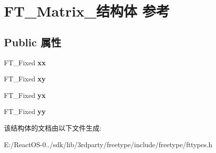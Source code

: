\hypertarget{struct_f_t___matrix__}{}\section{F\+T\+\_\+\+Matrix\+\_\+结构体 参考}
\label{struct_f_t___matrix__}
\subsection*{Public 属性}
\begin{DoxyCompactItemize}
\item 
\mbox{\label{struct_f_t___matrix___a27d51c2958634abe7bf377610e095f74}} 
F\+T\+\_\+\+Fixed {\bfseries xx}
\item 
\mbox{\label{struct_f_t___matrix___a7e9f439d37c00ba1a11919bcaa8937a2}} 
F\+T\+\_\+\+Fixed {\bfseries xy}
\item 
\mbox{\label{struct_f_t___matrix___a55792583a843a1611b43c40534a02a17}} 
F\+T\+\_\+\+Fixed {\bfseries yx}
\item 
\mbox{\label{struct_f_t___matrix___a689a6fd20a88238788b90c3597ee0c2a}} 
F\+T\+\_\+\+Fixed {\bfseries yy}
\end{DoxyCompactItemize}


该结构体的文档由以下文件生成\+:\begin{DoxyCompactItemize}
\item 
E\+:/\+React\+O\+S-\/0../sdk/lib/3rdparty/freetype/include/freetype/fttypes.\+h\end{DoxyCompactItemize}
